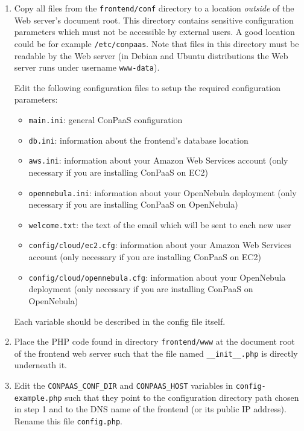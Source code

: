 \documentclass[10pt]{article}
\begin{document}
\begin{enumerate}
  \item Copy all files from the \verb+frontend/conf+ directory to a
  location \emph{outside} of the Web server's document root.
  This directory contains sensitive configuration parameters which
  must not be accessible by external users. A good location could be
  for example \verb+/etc/conpaas+. Note that files in this
  directory must be readable by the Web server (in Debian and Ubuntu
  distributions the Web server runs under username \verb+www-data+).

  Edit the following configuration files to setup the required
  configuration parameters:
  \begin{itemize}
  \item \texttt{main.ini}: general ConPaaS configuration
  \item \texttt{db.ini}: information about the frontend's database location
  \item \texttt{aws.ini}: information about your Amazon Web Services
    account (only necessary if you are installing ConPaaS on EC2)
  \item \texttt{opennebula.ini}: information about your OpenNebula
    deployment (only necessary if you are installing ConPaaS on
    OpenNebula)
  \item \texttt{welcome.txt}: the text of the email which will be sent
    to each new user
  \item \texttt{config/cloud/ec2.cfg}: information about your Amazon
    Web Services account (only necessary if you are installing ConPaaS
    on EC2)
  \item \texttt{config/cloud/opennebula.cfg}: information about your
    OpenNebula deployment (only necessary if you are installing
    ConPaaS on OpenNebula)
  \end{itemize}

  Each variable should be described in the config file itself. 

  \item Place the PHP code found in directory \verb+frontend/www+ at the
  document root of the frontend web server such that the file named
  \verb+__init__.php+ is directly underneath it.

  \item Edit the \verb+CONPAAS_CONF_DIR+ and \verb+CONPAAS_HOST+ variables in
  \verb+config-example.php+ such that they point to the configuration
  directory path chosen in step 1 and to the DNS name of the frontend
  (or its public IP address). Rename this file \verb+config.php+.


\end{enumerate}
\end{document}
